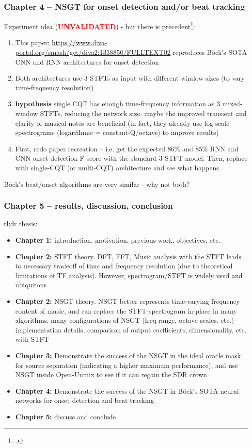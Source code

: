 \documentclass[usenames,dvipsnames]{beamer}
\begin{document}
\begin{frame}
	\frametitle{Chapter 4 -- NSGT for onset detection and/or beat tracking}
	Experiment idea (\textcolor{red}{\textbf{UNVALIDATED}}) - but there is precedent\footcite{beatnsgt}:
	\begin{enumerate}
		\item
			This paper: \href{https://www.diva-portal.org/smash/get/diva2:1338850/FULLTEXT02}{https://www.diva-portal.org/smash/get/diva2:1338850/FULLTEXT02} reproduces B{\"o}ck's SOTA CNN and RNN architectures for onset detection
		\item
			Both architectures use 3 STFTs as input with different window sizes (to vary time-frequency resolution)
		\item
			\textbf{hypothesis} single CQT has enough time-frequency information as 3 mixed-window STFTs, reducing the network size. maybe the improved transient and clarity of musical notes are beneficial (in fact, they already use log-scale spectrograms (logarithmic = constant-Q/octave) to improve results)
		\item
			First, redo paper recreation -- i.e, get the expected 86\% and 85\% RNN and CNN onset detection F-score with the standard 3 STFT model. Then, replace with single-CQT (or multi-CQT) architecture and see what happens
	\end{enumerate}
	B{\"o}ck's beat/onset algorithms are very similar - why not both?
\end{frame}

\begin{frame}
	\frametitle{Chapter 5 -- results, discussion, conclusion}
	tl;dr thesis:
	\begin{itemize}
		\item
			\textbf{Chapter 1:} introduction, motivation, previous work, objectives, etc.
		\item
			\textbf{Chapter 2:} STFT theory. DFT, FFT, Music analysis with the STFT leads to necessary tradeoff of time and frequency resolution (due to theoretical limitations of TF analysis). However, spectrogram/STFT is widely used and ubiquitous
		\item
			\textbf{Chapter 2:} NSGT theory. NSGT better represents time-varying frequency content of music, and can replace the STFT-spectrogram in-place in many algorithms. many configurations of NSGT (freq range, octave scales, etc.) implementation details, comparison of output coefficients, dimensionality, etc. with STFT
		\item
			\textbf{Chapter 3:} Demonstrate the success of the NSGT in the ideal oracle mask for source separation (indicating a higher maximum performance), and use NSGT inside Open-Unmix to see if it can regain the SDR crown
		\item
			\textbf{Chapter 4:} Demonstrate the success of the NSGT in B{\"o}ck's SOTA neural networks for onset detection and beat tracking
		\item
			\textbf{Chapter 5:} discuss and conclude
	\end{itemize}
\end{frame}
\end{document}
